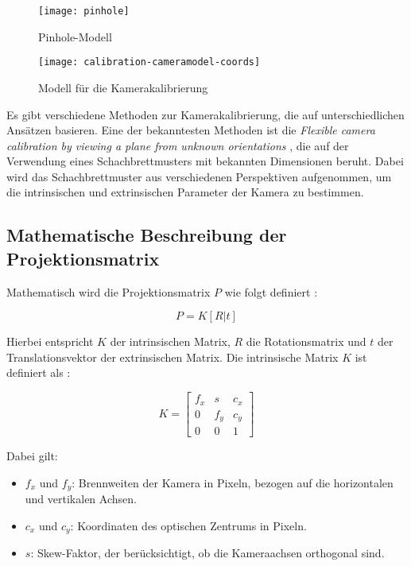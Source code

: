 \begin{figure}[ht]
    \centering
    \begin{minipage}{0.45\textwidth}
        \centering
        \texttt{[image: pinhole]}
        \caption{Pinhole-Modell \cite{mw2024calibration}\label{fig:Pinhole}}
    \end{minipage}
    \hfill
    \begin{minipage}{0.45\textwidth}
        \centering
        \texttt{[image: calibration-cameramodel-coords]}
        \caption{Modell für die Kamerakalibrierung \cite{mw2024calibration}\label{fig:Kalibrierung}}
    \end{minipage}
\end{figure}

Es gibt verschiedene Methoden zur Kamerakalibrierung, die auf unterschiedlichen Ansätzen basieren. Eine der bekanntesten Methoden ist die \emph{Flexible camera calibration by viewing a plane from unknown orientations} \cite{zhang1999calibration}, die auf der Verwendung eines Schachbrettmusters mit bekannten Dimensionen beruht. Dabei wird das Schachbrettmuster aus verschiedenen Perspektiven aufgenommen, um die intrinsischen und extrinsischen Parameter der Kamera zu bestimmen. \cite{stachniss2021calibration, zhang1999calibration}

\subsection{Mathematische Beschreibung der Projektionsmatrix}

Mathematisch wird die Projektionsmatrix \(P\) wie folgt definiert \cite{mw2024calibration, szeliski2022computerVision}:

\[
P = K[R|t]
\]

Hierbei entspricht \(K\) der intrinsischen Matrix, \(R\) die Rotationsmatrix und \(t\) der Translationsvektor der extrinsischen Matrix. Die intrinsische Matrix \(K\) ist definiert als \cite{mw2024calibration}:

\[
K = 
\begin{bmatrix}
f_x & s & c_x \\
0 & f_y & c_y \\
0 & 0 & 1
\end{bmatrix}
\]

Dabei gilt:

\begin{itemize}
    \item \( f_x \) und \( f_y \): Brennweiten der Kamera in Pixeln, bezogen auf die horizontalen und vertikalen Achsen.
    \item \( c_x \) und \( c_y \): Koordinaten des optischen Zentrums in Pixeln.
    \item \( s \): Skew-Faktor, der berücksichtigt, ob die Kameraachsen orthogonal sind.
\end{itemize}

